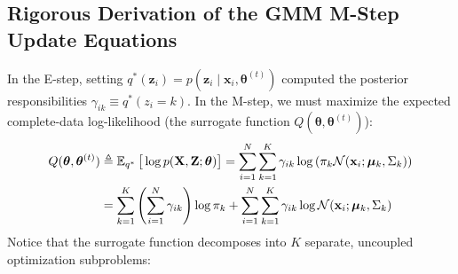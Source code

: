 \subsection{Rigorous Derivation of the GMM M-Step Update Equations}
In the E-step, setting $q^*(\mathbf{z}_i) = p(\mathbf{z}_i \mid \mathbf{x}_i, \boldsymbol{\theta}^{(t)})$ computed the posterior responsibilities $\gamma_{ik} \equiv q^*(z_i = k)$. In the M-step, we must maximize the expected complete-data log-likelihood (the surrogate function $Q(\boldsymbol{\theta}, \boldsymbol{\theta}^{(t)})$):
\begin{align}
Q(\boldsymbol{\theta}, \boldsymbol{\theta}^{(t)}) &\triangleq \operatorname{\mathbb{E}}_{q^*}\big[\log p(\mathbf{X}, \mathbf{Z}; \boldsymbol{\theta})\big] = \sum_{i=1}^N \sum_{k=1}^K \gamma_{ik} \log\left( \pi_k \mathcal{N}(\mathbf{x}_i; \boldsymbol{\mu}_k, \Sigma_k) \right) \nonumber \\
&= \sum_{k=1}^K \left( \sum_{i=1}^N \gamma_{ik} \right) \log \pi_k + \sum_{i=1}^N \sum_{k=1}^K \gamma_{ik} \log \mathcal{N}(\mathbf{x}_i; \boldsymbol{\mu}_k, \Sigma_k)
\label{eq:q_surrogate}
\end{align}
Notice that the surrogate function decomposes into $K$ separate, uncoupled optimization subproblems:


